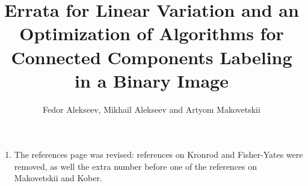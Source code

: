 \documentclass{article}
\begin{document}
\title{Errata for Linear Variation and an Optimization of Algorithms for Connected
Components Labeling in a Binary Image}

\author{Fedor Alekseev, Mikhail Alekseev and Artyom Makovetskii}

\date{}

\maketitle

\begin{enumerate}
  \item The references page was revised: references on Kronrod and Fisher-Yates
    were removed, as well the extra number before one of the references on
    Makovetskii and Kober.
\end{enumerate}
\end{document}

